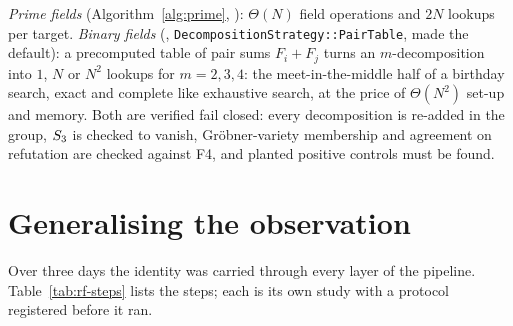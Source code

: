 \emph{Prime fields} (Algorithm~\ref{alg:prime},
): $\Theta(N)$ field operations and
$2N$ lookups per target. \emph{Binary fields}
(,
\texttt{DecompositionStrategy::PairTable}, made the default): a precomputed
table of pair sums $F_i+F_j$ turns an $m$-decomposition into $1$, $N$ or
$N^2$ lookups for $m=2,3,4$: the meet-in-the-middle half of a birthday
search, exact and complete like exhaustive search, at the price of
$\Theta(N^2)$ set-up and memory. Both are verified fail closed: every
decomposition is re-added in the group, $S_{3}$ is checked to vanish,
Gr\"obner-variety membership and agreement on refutation are checked
against F4, and planted positive controls must be found.

\section{Generalising the observation}

Over three days the identity was carried through every layer of the
pipeline. Table~\ref{tab:rf-steps} lists the steps; each is its own study
with a protocol registered before it ran.

